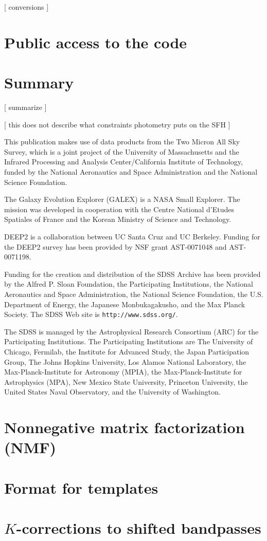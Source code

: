 \documentclass[10pt,preprint]{aastex}
\begin{document}
[ conversions ]

\section{Public access to the code}
\label{code}

\section{Summary}
\label{conclusions}

[ summarize ]

[ this does not describe what constraints photometry puts on the SFH ]

\acknowledgments

This publication makes use of data products from the Two Micron All
Sky Survey, which is a joint project of the University of
Massachusetts and the Infrared Processing and Analysis
Center/California Institute of Technology, funded by the National
Aeronautics and Space Administration and the National Science
Foundation.

The Galaxy Evolution Explorer (GALEX) is a NASA Small Explorer. The
mission was developed in cooperation with the Centre National d'Etudes
Spatiales of France and the Korean Ministry of Science and Technology.

DEEP2 is a collaboration between UC Santa Cruz and UC Berkeley.
Funding for the DEEP2 survey has been provided by NSF grant
AST-0071048 and AST-0071198.

Funding for the creation and distribution of the SDSS Archive has been
provided by the Alfred P. Sloan Foundation, the Participating
Institutions, the National Aeronautics and Space Administration, the
National Science Foundation, the U.S. Department of Energy, the
Japanese Monbukagakusho, and the Max Planck Society. The SDSS Web site
is {\tt http://www.sdss.org/}.

The SDSS is managed by the Astrophysical Research Consortium (ARC) for
the Participating Institutions. The Participating Institutions are The
University of Chicago, Fermilab, the Institute for Advanced Study, the
Japan Participation Group, The Johns Hopkins University, Los Alamos
National Laboratory, the Max-Planck-Institute for Astronomy (MPIA),
the Max-Planck-Institute for Astrophysics (MPA), New Mexico State
University, Princeton University, the United States Naval Observatory,
and the University of Washington.
 



\appendix

\section{Nonnegative matrix factorization (NMF)}
\label{nmf}

\section{Format for templates}
\label{format}

\section{$K$-corrections to shifted bandpasses}
\label{bandshift}

\newpage

%


\end{document}
